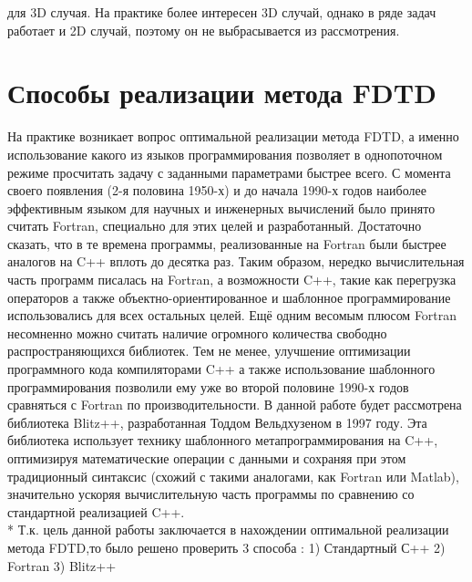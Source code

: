 \documentclass[10pt]{article}
\begin{document}
для 3D случая. На практике более интересен 3D случай, однако в ряде задач
работает и 2D случай, поэтому он не выбрасывается из рассмотрения.
\section{Способы реализации метода FDTD}
\label{fdtd_coding}
На практике возникает вопрос оптимальной реализации метода FDTD, а именно
использование какого из языков программирования позволяет в однопоточном
режиме просчитать задачу с заданными параметрами быстрее всего. С момента 
своего появления (2-я половина 1950-х) и до начала 1990-х годов наиболее 
эффективным языком для научных и инженерных вычислений было принято считать 
Fortran, специально для этих целей и разработанный. Достаточно сказать, что в 
те времена программы, реализованные на Fortran были быстрее аналогов на C++ 
вплоть до десятка раз\cite{Todd1997}. Таким образом, нередко вычислительная 
часть программ писалась на Fortran, а возможности C++, такие как перегрузка 
операторов а также объектно-ориентированное и шаблонное программирование 
использовались для всех остальных целей. Ещё одним весомым плюсом Fortran 
несомненно можно считать наличие огромного количества свободно распространяющихся
библиотек. Тем не менее, улучшение оптимизации программного кода компиляторами 
C++ а также использование шаблонного программирования позволили ему уже во второй
половине 1990-х годов сравняться с Fortran по производительности. В данной работе
будет рассмотрена библиотека Blitz++\cite{blitz_web}, разработанная Тоддом
Вельдхузеном в 1997 году. Эта библиотека использует технику шаблонного
метапрограммирования на C++, оптимизируя математические операции с данными и
сохраняя при этом традиционный синтаксис (схожий с такими аналогами, как 
Fortran или Matlab), значительно ускоряя вычислительную часть программы по 
сравнению со стандартной реализацией C++.\\*
Т.к. цель данной работы заключается в нахождении оптимальной реализации
метода FDTD,то было решено проверить 3 способа : 1) Стандартный С++ 2) Fortran 
3) Blitz++
\end{document}
